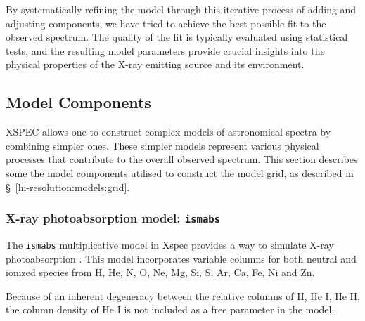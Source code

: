 			By systematically refining the model through this iterative process of adding and adjusting components, we have tried to achieve the best possible fit to the observed spectrum. The quality of the fit is typically evaluated using statistical tests, and the resulting model parameters provide crucial insights into the physical properties of the X-ray emitting source and its environment.
	  
	
		\subsection{Model Components} \label{hi-resolution:models:components}
			XSPEC allows one to construct complex models of astronomical spectra by combining simpler ones. These simpler models represent various physical processes that contribute to the overall observed spectrum. This section describes some the model components utilised to construct the model grid, as described in \S\ \ref{hi-resolution:models:grid}.
		
			\subsubsection{X-ray photoabsorption model: \texttt{ismabs}}
			The \texttt{ismabs} multiplicative model in Xspec provides a way to simulate X-ray photoabsorption \cite{gatuzz2015ismabs}. This model incorporates variable columns for both neutral and ionized species from H, He, N, O, Ne, Mg, Si, S, Ar, Ca, Fe, Ni and Zn.
			
			Because of an inherent degeneracy between the relative columns of H, He I, He II, the column density of He I is not included as a free parameter in the model.
			
